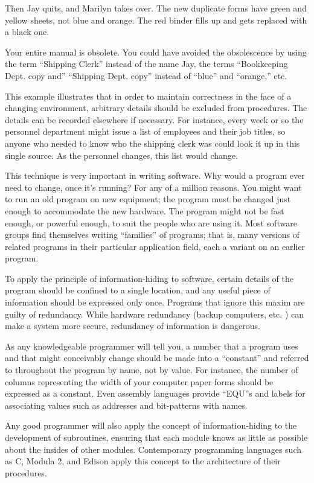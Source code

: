 Then Jay quits, and Marilyn takes over. The new duplicate forms have
green and yellow sheets, not blue and orange. The red binder fills up
and gets replaced with a black one.

Your entire manual is obsolete. You could have avoided the
obsolescence by using the term ``Shipping Clerk'' instead of the name
Jay, the terms ``Bookkeeping Dept. copy and'' ``Shipping Dept.  copy''
instead of ``blue'' and ``orange,'' etc.

This example illustrates that in order to maintain correctness in the
face of a changing environment, arbitrary details should be excluded
from procedures. The details can be recorded elsewhere if necessary.
For instance, every week or so the personnel department might issue a
list of employees and their job titles, so anyone who needed to know
who the shipping clerk was could look it up in this single source.  As
the personnel changes, this list would change.

This technique is very important in writing software. Why would a
program ever need to change, once it's running? For any of a million
reasons. You might want to run an old program on new equipment; the
program must be changed just enough to accommodate the new hardware.
The program might not be fast enough, or powerful enough, to suit the
people who are using it. Most software groups find themselves writing
``families'' of programs; that is, many versions of related programs
in their particular application field, each a variant on an earlier
program. 

To apply the principle of information-hiding to software, certain
details of the program should be confined to a single location, and
any useful piece of information should be expressed only once.
Programs that ignore this maxim are guilty of redundancy. While
hardware redundancy (backup computers, etc. ) can make a system more
secure, redundancy of information is dangerous.

As any knowledgeable programmer will tell you, a number that a program
uses and that might conceivably change should be made into a
``constant'' and referred to throughout the program by name, not by
value. For instance, the number of columns representing the width of
your computer paper forms should be expressed as a constant. Even
assembly languages provide ``EQU''s and labels for associating values
such as addresses and bit-patterns with names.

Any good programmer will also apply the concept of information-hiding
to the development of subroutines, ensuring that each module knows as
little as possible about the insides of other modules. Contemporary
programming languages such as C, Modula 2, and Edison apply this
concept to the architecture of their procedures.

